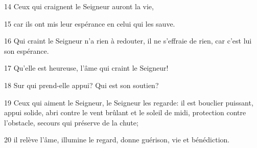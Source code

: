 14 Ceux qui craignent le Seigneur auront la vie,

15 car ils ont mis leur espérance en celui qui les sauve.

16 Qui craint le Seigneur n’a rien à redouter, il ne s’effraie de rien, car c’est lui son espérance.

17 Qu’elle est heureuse, l’âme qui craint le Seigneur!

18 Sur qui prend-elle appui? Qui est son soutien?

19 Ceux qui aiment le Seigneur, le Seigneur les regarde: il est bouclier puissant, appui solide, abri contre le vent brûlant et le soleil de midi, protection contre l’obstacle, secours qui préserve de la chute;

20 il relève l’âme, illumine le regard, donne guérison, vie et bénédiction.